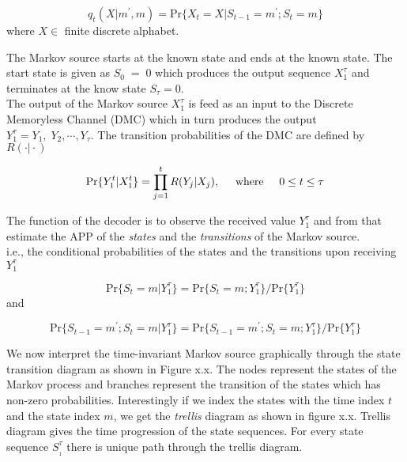 \begin{equation}
q_t(X\vert m^{'},m)=\mathrm{Pr}\{X_t=X\vert S_{t-1}=m^{'};S_t=m\}
\end{equation}
where $X\in$ finite discrete alphabet.

The Markov source starts at the known state and ends at the known state. The start state is given as $S_0\;=\;0$ which produces the output sequence $X_1^{\tau}$ and terminates at the know state $S_{\tau}=0$. \\

The output of the Markov source $X_1^{\tau}$ is feed as an input to the Discrete Memoryless Channel (DMC) which in turn produces the output $Y_1^{\tau}=Y_1,\;Y_2,\cdots,Y_{\tau}$. The transition probabilities of the DMC are defined by $R(\cdot\vert \cdot)$

\begin{equation}
\mathrm{Pr}\{Y_1^{t}\vert X_1^{t}\}=\prod\limits_{j=1}^{t}R(Y_j\vert X_j),\hspace{5mm}\mathrm{where}\hspace{5mm}0\leq t \leq \tau
\end{equation}

The function of the decoder is to observe the received value $Y_1^{\tau}$ and from that estimate the APP of the \textit{states} and the \textit{transitions} of the Markov source. \\
i.e., the conditional probabilities of the states and the transitions upon receiving $Y_1^{\tau}$ 

\begin{equation}
\mathrm{Pr}\{S_t=m\vert Y_1^{\tau}\}=\mathrm{Pr}\{S_t=m;Y_1^{\tau}\}/\mathrm{Pr}\{Y_1^{\tau}\}
\end{equation}
and

\begin{equation}
\mathrm{Pr}\{S_{t-1}=m^{'};S_t=m\vert Y_1^{\tau}\}=\mathrm{Pr}\{S_{t-1}=m^{'};S_t=m;Y_1^{\tau}\}/\mathrm{Pr}\{Y_1^{\tau}\}
\end{equation}

We now interpret the time-invariant Markov source graphically through the state transition diagram as shown in Figure x.x. The nodes represent the states of the Markov process and branches represent the transition of the states which has non-zero probabilities. Interestingly if we index the states with the time index $t$ and the state index $m$, we get the \textit{trellis} diagram as shown in figure x.x. Trellis diagram gives the time progression of the state sequences. For every state sequence $S_{_1}^{\tau}$ there is unique path through the trellis diagram. \\

